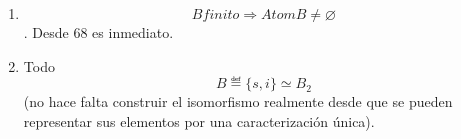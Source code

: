 \documentclass[
]{article}
\providecommand{\tightlist}{%
  \setlength{\itemsep}{0pt}\setlength{\parskip}{0pt}}
\begin{document}
\begin{enumerate}
\begin{enumerate}
\begin{enumerate}
      \begin{enumerate}
      \def\labelenumiv{\arabic{enumiv}.}
      \tightlist
      \item
        \[{\langle{P, \supseteq}\rangle}\mathit{es}\mathit{un}\mathit{orden}\mathit{total}\]
      \item
        \[\forall X,{Y \in P}{X \neq Y}\Rightarrow{{X \supset {Y \vee Y}} \supset X}\]
      \item
        \[\forall X,{Y \in P}{X \neq Y}\Rightarrow{\left( {\left( {Y \supset X} \right) \vee \left( {Y \supset X} \right)} \right) \land \left( {\left( {{Y \cap X} = X} \right) \vee \left( {{Y \cap X} = Y} \right)} \right)}\]
      \item
        \[\forall X,{Y \in P}{X \neq Y}\Rightarrow{\left( {\left( {{Y \cap X} = X} \right) \vee \left( {{Y \cap X} = Y} \right)} \right) \land \left( {{X \neq {{\{ 0\}} \land Y}} \neq {\{ 0\}}} \right)}\]
      \item
        \[\forall X,{Y \in P}\left( {X \neq Y} \right)\Rightarrow\left( {{Y \cap X} \neq {\{ 0\}}} \right)\]
      \item
        \[\underset{X \in P}{\cap}{X \neq {{\{ 0\}} \land \underset{X \in P}{\cap}}}{X \supset {\{ 0\}}}\]
      \item
        \[\underset{Y \in P}{\cap}Y \supsetneq {\{ 0\}}\]
      \item
        \[\underset{Y \in P}{\cap}{Y \supseteq {\{{0,x}\}}}\]
      \item
        \[\underset{Y \in P}{\cap}{Y \supseteq {\lbrack{x,0}\rbrack}_{B}}\]
      \item
        \[\underset{Y \in P}{\cap}{{Y \supseteq {\lbrack{x,0}\rbrack}_{B}} \supseteq {\{{0,x}\}}}\]
      \item
        \[{\lbrack{x,0}\rbrack}_{B} \in P\]
      \item
        \[\exists{X \in P}\exists{x \in X}{\underset{Y \in P}{\cap}{Y = {\lbrack{x,0}\rbrack}_{B}}}\]
      \item
        \[\exists!{x \in B}{\underset{Y \in P}{\cap}{Y = {\lbrack{x,0}\rbrack}_{B}}}\]
      \item
        \[\exists{x \in {\underset{Y \in P}{\cap}Y{{\lbrack{x,0}\rbrack}_{B} = {\{{0,x}\}}}}}\]
      \item
        \[\exists{x \in {\underset{Y \in P}{\cap}Y\forall{X \in P}{{X \supseteq {\lbrack{x,0}\rbrack}_{B}} = {\{{0,x}\}}}}}\]
      \item
        \[\forall{P \subset \left\lbrack B \right)}{\langle{P, \supseteq}\rangle}\mathit{orden}\mathit{total}\Rightarrow\exists!{x \in \underset{X \in P}{\cap}}X\mathsf{\mathit{atom}}_{B}{(x)}\]
      \end{enumerate}
    \item
      \[B\mathit{finito}\Rightarrow\mathit{Atom}{B \neq \varnothing}\].
      Desde 68 es inmediato.
    \item
      Todo \[B ≝ {{\{{s,i}\}} \simeq B_{2}}\](no hace falta construir el
      isomorfismo realmente desde que se pueden representar sus
      elementos por una caracterización única).


\end{enumerate}
\end{enumerate}
\end{enumerate}
\end{document}
